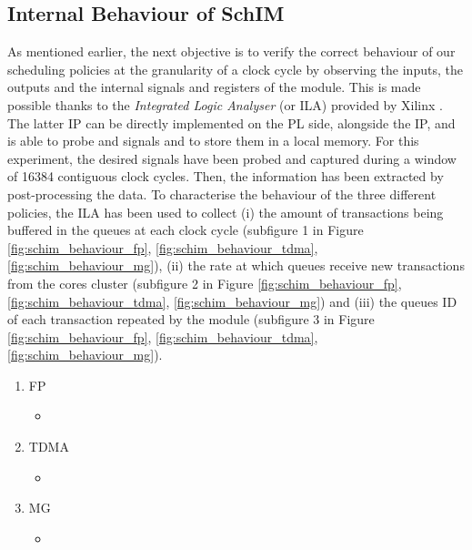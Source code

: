   \subsection{Internal Behaviour of SchIM}
    \label{subsec:internal-behaviour-of-schim}    
    As mentioned earlier, the next objective is to verify the correct behaviour of our scheduling policies at the granularity of a clock cycle by observing the inputs, the outputs and the internal signals and registers of the \schim module.
    This is made possible thanks to the \emph{Integrated Logic Analyser} (or ILA) provided by Xilinx \cite{Xilinx-ILA}. The latter IP can be directly implemented on the PL side, alongside the \schim IP, and is able to probe and signals and to store them in a local memory. For this experiment, the desired signals have been probed and captured during a window of 16384 contiguous clock cycles. Then, the information has been extracted by post-processing the data.
    To characterise the behaviour of the three different policies, the ILA has been used to collect (i) the amount of transactions being buffered in the queues at each clock cycle (subfigure 1 in Figure \ref{fig:schim_behaviour_fp}, \ref{fig:schim_behaviour_tdma}, \ref{fig:schim_behaviour_mg}), (ii) the rate at which queues receive new transactions from the cores cluster (subfigure 2 in Figure \ref{fig:schim_behaviour_fp}, \ref{fig:schim_behaviour_tdma}, \ref{fig:schim_behaviour_mg}) and (iii) the queues ID of each transaction repeated by the \schim module (subfigure 3 in Figure \ref{fig:schim_behaviour_fp}, \ref{fig:schim_behaviour_tdma}, \ref{fig:schim_behaviour_mg}).
    \begin{enumerate}
      \item FP
        \begin{itemize}
          \item 
        \end{itemize}
      \item TDMA
        \begin{itemize}
          \item 
        \end{itemize}
      \item MG
        \begin{itemize}
          \item 
        \end{itemize}
    \end{enumerate}    
